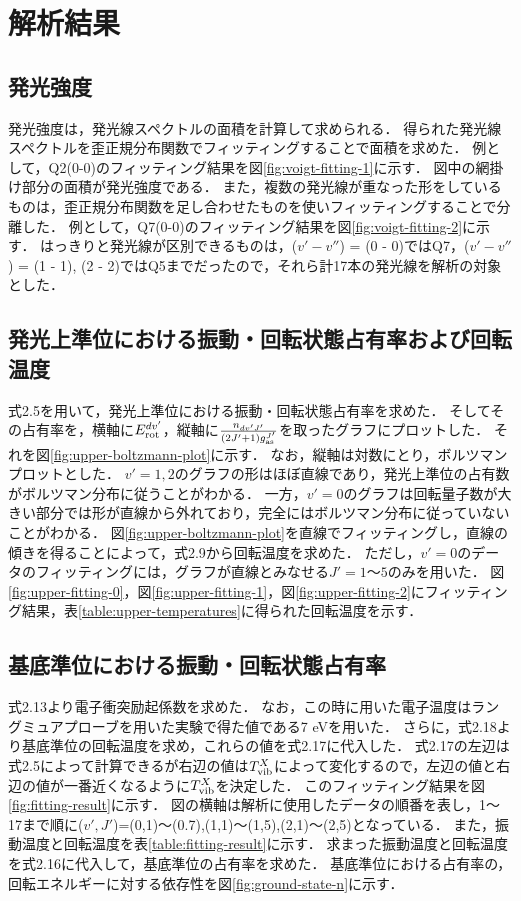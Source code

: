 \chapter{解析結果}

\section{発光強度}
発光強度は，発光線スペクトルの面積を計算して求められる．
得られた発光線スペクトルを歪正規分布関数でフィッティングすることで面積を求めた．
例として，Q2(0-0)のフィッティング結果を図\ref{fig:voigt-fitting-1}に示す．
図中の網掛け部分の面積が発光強度である．
また，複数の発光線が重なった形をしているものは，歪正規分布関数を足し合わせたものを使いフィッティングすることで分離した．
例として，Q7(0-0)のフィッティング結果を図\ref{fig:voigt-fitting-2}に示す．
はっきりと発光線が区別できるものは，($v'-v''$) = (0 - 0)ではQ7，($v'-v''$) = (1 - 1), (2 - 2)ではQ5までだったので，それら計17本の発光線を解析の対象とした．

\section{発光上準位における振動・回転状態占有率および回転温度}
式2.5を用いて，発光上準位における振動・回転状態占有率を求めた．
そしてその占有率を，横軸に$E^{dv'}_{\rm rot}$，縦軸に$\frac{n_{dv'J'}}{\left( 2J'+1 \right) g^{J'}_{\rm as}}$を取ったグラフにプロットした．
それを図\ref{fig:upper-boltzmann-plot}に示す．
なお，縦軸は対数にとり，ボルツマンプロットとした．
$v'=1,2$のグラフの形はほぼ直線であり，発光上準位の占有数がボルツマン分布に従うことがわかる．
一方，$v'=0$のグラフは回転量子数が大きい部分では形が直線から外れており，完全にはボルツマン分布に従っていないことがわかる．
図\ref{fig:upper-boltzmann-plot}を直線でフィッティングし，直線の傾きを得ることによって，式2.9から回転温度を求めた．
ただし，$v'=0$のデータのフィッティングには，グラフが直線とみなせる$J'=1〜5$のみを用いた．
図\ref{fig:upper-fitting-0}，図\ref{fig:upper-fitting-1}，図\ref{fig:upper-fitting-2}にフィッティング結果，表\ref{table:upper-temperatures}に得られた回転温度を示す．

\section{基底準位における振動・回転状態占有率}
式2.13より電子衝突励起係数を求めた．
なお，この時に用いた電子温度はラングミュアプローブを用いた実験で得た値である7 eV\cite{yun}を用いた．
さらに，式2.18より基底準位の回転温度を求め，これらの値を式2.17に代入した．
式2.17の左辺は式2.5によって計算できるが右辺の値は$T^X_{\rm vib}$によって変化するので，左辺の値と右辺の値が一番近くなるように$T^X_{\rm vib}$を決定した．
このフィッティング結果を図\ref{fig:fitting-result}に示す．
図の横軸は解析に使用したデータの順番を表し，1〜17まで順に($v',J'$)=(0,1)〜(0.7),(1,1)〜(1,5),(2,1)〜(2,5)となっている．
また，振動温度と回転温度を表\ref{table:fitting-result}に示す．
求まった振動温度と回転温度を式2.16に代入して，基底準位の占有率を求めた．
基底準位における占有率の，回転エネルギーに対する依存性を図\ref{fig:ground-state-n}に示す．